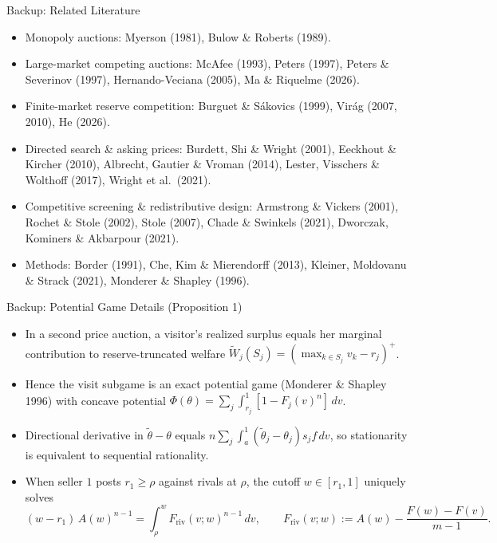 \documentclass[11pt,aspectratio=169,handout]{beamer}
\def\meditem{\smallskip\item}
\begin{document}
\begin{frame}[noframenumbering]{Backup: Related Literature}
\begin{itemize}
\item \alert{Monopoly auctions}: Myerson (1981), Bulow \& Roberts (1989).
\meditem \alert{Large-market competing auctions}: McAfee (1993), Peters (1997), Peters \& Severinov (1997), Hernando-Veciana (2005), Ma \& Riquelme (2026).
\meditem \alert{Finite-market reserve competition}: Burguet \& S\'akovics (1999), Vir\'ag (2007, 2010), He (2026).
\meditem \alert{Directed search \& asking prices}: Burdett, Shi \& Wright (2001), Eeckhout \& Kircher (2010), Albrecht, Gautier \& Vroman (2014), Lester, Visschers \& Wolthoff (2017), Wright et al.\ (2021).
\meditem \alert{Competitive screening \& redistributive design}: Armstrong \& Vickers (2001), Rochet \& Stole (2002), Stole (2007), Chade \& Swinkels (2021), Dworczak, Kominers \& Akbarpour (2021).
\meditem \alert{Methods}: Border (1991), Che, Kim \& Mierendorff (2013), Kleiner, Moldovanu \& Strack (2021), Monderer \& Shapley (1996).
\end{itemize}
\end{frame}

\begin{frame}[noframenumbering]{Backup: Potential Game Details (Proposition 1)}
\begin{itemize}
\item In a second price auction, a visitor's realized surplus equals her marginal contribution to reserve-truncated welfare $\widetilde W_j(S_j)=(\max_{k\in S_j}v_k-r_j)^+$.
\meditem Hence the visit subgame is an exact potential game (Monderer \& Shapley 1996) with concave potential $\Phi(\theta)=\sum_j\int_{r_j}^1[1-F_j(v)^n]\,dv$.
\meditem Directional derivative in $\tilde\theta-\theta$ equals $n\sum_j\int_a^1(\tilde\theta_j-\theta_j)s_j f\,dv$, so stationarity is equivalent to sequential rationality.
\meditem When seller $1$ posts $r_1\ge\rho$ against rivals at $\rho$, the cutoff $w\in[r_1,1]$ uniquely solves
\[
(w-r_1)\,A(w)^{n-1} = \int_\rho^w F_{\mathrm{riv}}(v;w)^{n-1}\,dv, \qquad F_{\mathrm{riv}}(v;w):=A(w)-\frac{F(w)-F(v)}{m-1}.
\]
\end{itemize}
\end{frame}
\end{document}
